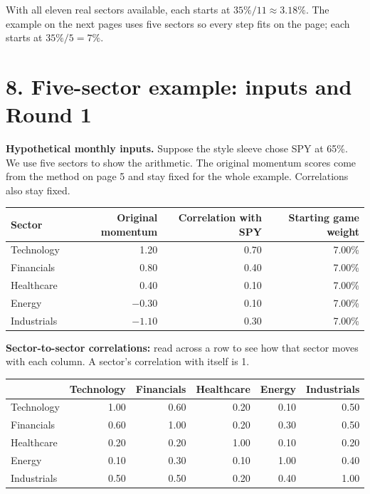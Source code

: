 \documentclass[11pt,letterpaper]{article}
\newcommand{\guidepage}[1]{\clearpage\section*{#1}}
\begin{document}
With all eleven real sectors available, each starts at $35\%/11\approx3.18\%$. The example on the next pages uses five sectors so every step fits on the page; each starts at $35\%/5=7\%$.

\guidepage{8. Five-sector example: inputs and Round 1}
\textbf{Hypothetical monthly inputs.} Suppose the style sleeve chose SPY at 65\%. We use five sectors to show the arithmetic. The original momentum scores come from the method on page 5 and stay fixed for the whole example. Correlations also stay fixed.
\begin{center}
\begin{tabular}{@{}lrrr@{}}
\toprule
Sector & Original momentum & Correlation with SPY & Starting game weight\\
\midrule
Technology & 1.20 & 0.70 & 7.00\%\\
Financials & 0.80 & 0.40 & 7.00\%\\
Healthcare & 0.40 & 0.10 & 7.00\%\\
Energy & $-0.30$ & 0.10 & 7.00\%\\
Industrials & $-1.10$ & 0.30 & 7.00\%\\
\bottomrule
\end{tabular}
\end{center}
\textbf{Sector-to-sector correlations:} read across a row to see how that sector moves with each column. A sector's correlation with itself is 1.
\begin{center}
\begin{tabular}{@{}lrrrrr@{}}
\toprule
 & Technology & Financials & Healthcare & Energy & Industrials\\
\midrule
Technology & 1.00 & 0.60 & 0.20 & 0.10 & 0.50\\
Financials & 0.60 & 1.00 & 0.20 & 0.30 & 0.50\\
Healthcare & 0.20 & 0.20 & 1.00 & 0.10 & 0.20\\
Energy & 0.10 & 0.30 & 0.10 & 1.00 & 0.40\\
Industrials & 0.50 & 0.50 & 0.20 & 0.40 & 1.00\\
\bottomrule
\end{tabular}
\end{center}
\end{document}
